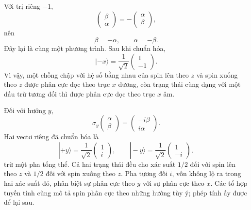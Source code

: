 Với trị riêng \(-1\),
\begin{equation}
\begin{pmatrix}
\beta\\
\alpha
\end{pmatrix}
=
-
\begin{pmatrix}
\alpha\\
\beta
\end{pmatrix},
\end{equation}
nên
\begin{equation}
\beta=-\alpha,
\qquad
\alpha=-\beta.
\end{equation}
Đây lại là cùng một phương trình. Sau khi chuẩn hóa,
\begin{equation}
|-x\rangle
=
\frac{1}{\sqrt2}
\begin{pmatrix}
1\\
-1
\end{pmatrix}.
\end{equation}
Vì vậy, một chồng chập với hệ số bằng nhau của spin lên theo \(z\) và spin xuống theo \(z\) được phân cực dọc theo trục \(x\) dương, còn trạng thái cùng dạng với một dấu trừ tương đối thì được phân cực dọc theo trục \(x\) âm.

Đối với hướng \(y\),
\begin{equation}
\sigma_y
\begin{pmatrix}
\alpha\\
\beta
\end{pmatrix}
=
\begin{pmatrix}
-i\beta\\
i\alpha
\end{pmatrix}.
\end{equation}
Hai vectơ riêng đã chuẩn hóa là
\begin{equation}
|+y\rangle
=
\frac{1}{\sqrt2}
\begin{pmatrix}
1\\
i
\end{pmatrix},
\qquad
|-y\rangle
=
\frac{1}{\sqrt2}
\begin{pmatrix}
1\\
-i
\end{pmatrix},
\end{equation}
trừ một pha tổng thể. Cả hai trạng thái đều cho xác suất \(1/2\) đối với spin lên theo \(z\) và \(1/2\) đối với spin xuống theo \(z\). Pha tương đối \(i\), vốn không lộ ra trong hai xác suất đó, phân biệt sự phân cực theo \(y\) với sự phân cực theo \(x\). Các tổ hợp tuyến tính cũng mô tả spin phân cực theo những hướng tùy ý; phép tính ấy được để lại sau.

